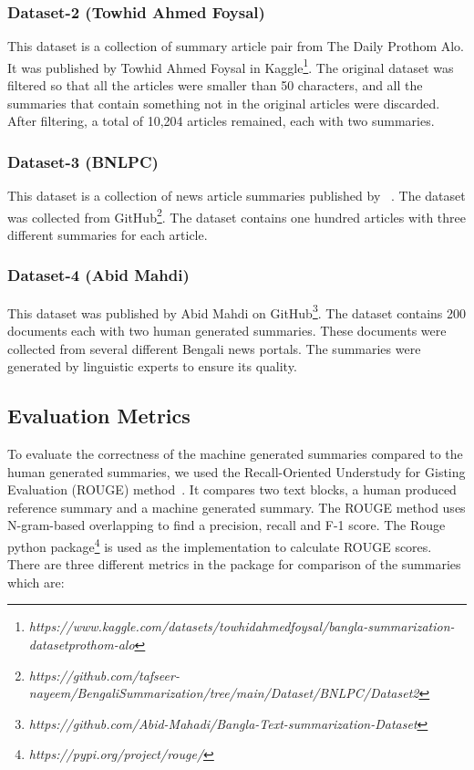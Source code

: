 \subsubsection{Dataset-2 (Towhid Ahmed Foysal)\cite{ahmed_2023_TAF_dataset}}
This dataset is a collection of summary article pair from The Daily Prothom Alo. It was published by Towhid Ahmed Foysal in Kaggle\footnote{\textit{https://www.kaggle.com/datasets/towhidahmedfoysal/bangla-summarization-datasetprothom-alo}}. The original dataset was filtered so that all the articles were smaller than 50 characters, and all the summaries that contain something not in the original articles were discarded. After filtering, a total of 10,204 articles remained, each with two summaries.

\subsubsection{Dataset-3 (BNLPC)\cite{Hque-2015-BNLPC-Dataset}}
This dataset is a collection of news article summaries published by \citeauthor{Hque-2015-BNLPC-Dataset}~\cite{Hque-2015-BNLPC-Dataset}. The dataset was collected from GitHub\footnote{\textit{https://github.com/tafseer-nayeem/BengaliSummarization/tree/main/Dataset/BNLPC/Dataset2}}. The dataset contains one hundred articles with three different summaries for each article.

\subsubsection{Dataset-4 (Abid Mahdi)}
This dataset was published by Abid Mahdi on GitHub\footnote{\textit{https://github.com/Abid-Mahadi/Bangla-Text-summarization-Dataset}}. The dataset contains 200 documents each with two human generated summaries. These documents were collected from several different Bengali news portals. The summaries were generated by linguistic experts to ensure its quality.


\subsection{Evaluation Metrics}\label{subsec:evaluation-metrics}
To evaluate the correctness of the machine generated summaries compared to the human generated summaries, we used the Recall-Oriented Understudy for Gisting Evaluation (ROUGE) method~\cite{lin-2004-rouge}. It compares two text blocks, a human produced reference summary and a machine generated summary. The ROUGE method uses N-gram-based overlapping to find a precision, recall and F-1 score. The Rouge python package\footnote{\textit{https://pypi.org/project/rouge/}} is used as the implementation to calculate ROUGE scores. There are three different metrics in the package for comparison of the summaries which are:

